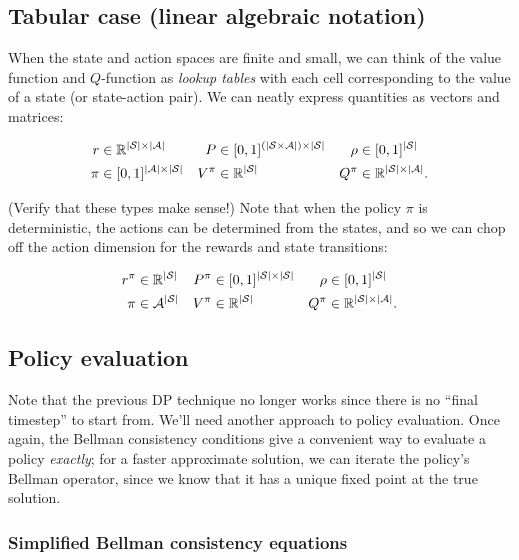 \documentclass[../main/main]{subfiles}
\begin{document}
\subsection{Tabular case (linear algebraic notation)}

When the state and action spaces are finite and small, we can think of the value function and $Q$-function as \emph{lookup tables} with each cell corresponding to the value of a state (or state-action pair). We can neatly express quantities as vectors and matrices:

\begin{align*}
    r &\in \mathbb{R}^{|\mathcal{S}| \times |\mathcal{A}|} &
    P &\in [0, 1]^{(|\mathcal{S} \times \mathcal{A}|) \times |\mathcal{S}|} &
    \rho &\in [0, 1]^{|\mathcal{S}|} \\
    \pi &\in [0, 1]^{|\mathcal{A}| \times |\mathcal{S}|} &
    V^\pi &\in \mathbb{R}^{|\mathcal{S}|} &
    Q^\pi &\in \mathbb{R}^{|\mathcal{S}| \times |\mathcal{A}|}.
\end{align*}

(Verify that these types make sense!) Note that when the policy $\pi$ is deterministic, the actions can be determined from the states, and so we can chop off the action dimension for the rewards and state transitions:

\begin{align*}
    r^{\pi} &\in \mathbb{R}^{|\mathcal{S}|} & P^{\pi} &\in [0, 1]^{|\mathcal{S}| \times |\mathcal{S}|} & \rho &\in [0, 1]^{|\mathcal{S}|} \\
    \pi &\in \mathcal{A}^{|\mathcal{S}|} & V^\pi &\in \mathbb{R}^{|\mathcal{S}|} & Q^\pi &\in \mathbb{R}^{|\mathcal{S}| \times |\mathcal{A}|}.
\end{align*}


\subsection{Policy evaluation}


Note that the previous DP technique no longer works since there is no ``final timestep'' to start from. We'll need another approach to policy evaluation. Once again, the Bellman consistency conditions give a convenient way to evaluate a policy \emph{exactly}; for a faster approximate solution, we can iterate the policy's Bellman operator, since we know that it has a unique fixed point at the true solution.


\subsubsection{Simplified Bellman consistency equations}
\end{document}
